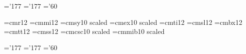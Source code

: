 \skewchar\teni='177
\skewchar\tenbi='177
\skewchar\tensy='60

\def\tenpoint{\ifmmode\err@badsizechange\else
	\textfont0=\tenrm \scriptfont0=\sevenrm \scriptscriptfont0=\fiverm
	\textfont1=\teni  \scriptfont1=\seveni  \scriptscriptfont1=\fivemi
	\textfont2=\tensy \scriptfont2=\sevensy \scriptscriptfont2=\fivesy
	\textfont3=\tenex \scriptfont3=\tenex   \scriptscriptfont3=\tenex
	\textfont4=\tenit \scriptfont4=\sevenit \scriptscriptfont4=\sevenit
	\textfont5=\tensl
	\textfont6=\tenbf \scriptfont6=\sevenbf \scriptscriptfont6=\fivebf
	\textfont7=\tentt
	\textfont8=\tenbi \scriptfont8=\seveni  \scriptscriptfont8=\fivemi
	\def\rm{\tenrm\fam=0 }%
	\def\it{\tenit\fam=4 }%
	\def\sl{\tensl\fam=5 }%
	\def\bf{\tenbf\fam=6 }%
	\def\tt{\tentt\fam=7 }%
	\def\ss{\tenss}%
	\def\sc{\tensc}%
	\def\bmit{\fam=8 }%
	\rm\setparameters\setbaselines\fi}


\font\twelverm=cmr12				%
\font\twelvei=cmmi12				%
\font\twelvesy=cmsy10	scaled		%
\font\twelveex=cmex10	scaled		%
\font\twelveit=cmti12				%
\font\twelvesl=cmsl12				%
\font\twelvebf=cmbx12				%
\font\twelvett=cmtt12				%
\font\twelvess=cmss12				%
\font\twelvesc=cmcsc10	scaled		%
\font\twelvebi=cmmib10	scaled		%

\skewchar\twelvei='177
\skewchar\twelvebi='177
\skewchar\twelvesy='60

\def\twelvepoint{\ifmmode\err@badsizechange\else
	\textfont0=\twelverm \scriptfont0=\eightrm \scriptscriptfont0=\sixrm
	\textfont1=\twelvei  \scriptfont1=\eighti  \scriptscriptfont1=\sixi
	\textfont2=\twelvesy \scriptfont2=\eightsy \scriptscriptfont2=\sixsy
	\textfont3=\twelveex \scriptfont3=\tenex   \scriptscriptfont3=\tenex
	\textfont4=\twelveit \scriptfont4=\eightit \scriptscriptfont4=\sevenit
	\textfont5=\twelvesl
	\textfont6=\twelvebf \scriptfont6=\eightbf \scriptscriptfont6=\sixbf
	\textfont7=\twelvett
	\textfont8=\twelvebi \scriptfont8=\eighti  \scriptscriptfont8=\sixi
	\def\rm{\twelverm\fam=0 }%
	\def\it{\twelveit\fam=4 }%
	\def\sl{\twelvesl\fam=5 }%
	\def\bf{\twelvebf\fam=6 }%
	\def\tt{\twelvett\fam=7 }%
	\def\ss{\twelvess}%
	\def\sc{\twelvesc}%
	\def\bmit{\fam=8 }%
	\rm\setparameters\setbaselines\fi}


